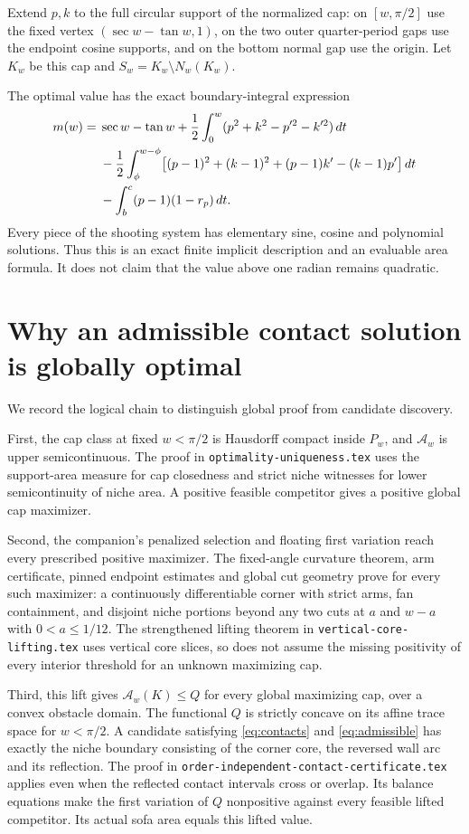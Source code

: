 \documentclass[11pt]{article}
\theoremstyle{remark}\newtheorem{remark}[theorem]{Remark}
\begin{document}
Extend $p,k$ to the full circular support of the normalized cap: on $[w,\pi/2]$ use the fixed vertex $(\sec w-\tan w,1)$, on the two outer quarter-period gaps use the endpoint cosine supports, and on the bottom normal gap use the origin. Let $K_w$ be this cap and $S_w=K_w\setminus N_w(K_w)$.

The optimal value has the exact boundary-integral expression
\begin{align}\label{eq:value}
 m(w)={}&\sec w-\tan w+\frac12\int_0^w(p^2+k^2-p'^2-k'^2)\,dt\notag\\
 &-\frac12\int_\phi^{w-\phi}\bigl[(p-1)^2+(k-1)^2+(p-1)k'-(k-1)p'\bigr]\,dt\notag\\
 &-\int_b^c(p-1)(1-r_p)\,dt.
\end{align}
Every piece of the shooting system has elementary sine, cosine and polynomial solutions. Thus this is an exact finite implicit description and an evaluable area formula. It does not claim that the value above one radian remains quadratic.

\section{Why an admissible contact solution is globally optimal}
We record the logical chain to distinguish global proof from candidate discovery.

First, the cap class at fixed $w<\pi/2$ is Hausdorff compact inside $P_w$, and $\mathcal A_w$ is upper semicontinuous. The proof in \texttt{optimality-uniqueness.tex} uses the support-area measure for cap closedness and strict niche witnesses for lower semicontinuity of niche area. A positive feasible competitor gives a positive global cap maximizer.

Second, the companion's penalized selection and floating first variation reach every prescribed positive maximizer. The fixed-angle curvature theorem, arm certificate, pinned endpoint estimates and global cut geometry prove for every such maximizer: a continuously differentiable corner with strict arms, fan containment, and disjoint niche portions beyond any two cuts at $a$ and $w-a$ with $0<a\le1/12$. The strengthened lifting theorem in \texttt{vertical-core-lifting.tex} uses vertical core slices, so does not assume the missing positivity of every interior threshold for an unknown maximizing cap.

Third, this lift gives $\mathcal A_w(K)\le Q$ for every global maximizing cap, over a convex obstacle domain. The functional $Q$ is strictly concave on its affine trace space for $w<\pi/2$. A candidate satisfying \eqref{eq:contacts} and \eqref{eq:admissible} has exactly the niche boundary consisting of the corner core, the reversed wall arc and its reflection. The proof in \texttt{order-independent-contact-certificate.tex} applies even when the reflected contact intervals cross or overlap. Its balance equations make the first variation of $Q$ nonpositive against every feasible lifted competitor. Its actual sofa area equals this lifted value.
\end{document}
